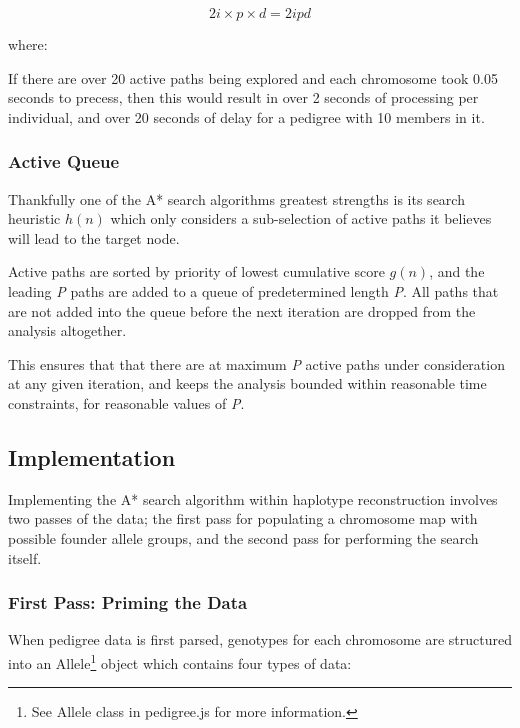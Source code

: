 \begin{equation}\label{eqn:time2proc}
2i \times p \times d = 2ipd
\end{equation}

where:
\begin{description}
\end{description}

If there are over 20 active paths being explored and each chromosome took 0.05 seconds to precess, then this would result in over 2 seconds of processing per individual, and over 20 seconds of delay for a pedigree with 10 members in it.

\subsubsection{Active Queue}

Thankfully one of the A* search algorithms greatest strengths is its search heuristic $h(n)$ which only considers a sub-selection of active paths it believes will lead to the target node. 

Active paths are sorted by priority of lowest cumulative score $g(n)$, and the leading \textit{P} paths are added to a queue of predetermined length \textit{P}. All paths that are not added into the queue before the next iteration are dropped from the analysis altogether. 

This ensures that that there are at maximum \textit{P} active paths under consideration at any given iteration, and keeps the analysis bounded within reasonable time constraints, for reasonable values of \textit{P}.


\subsection{Implementation}

Implementing the A* search algorithm within haplotype reconstruction involves two passes of the data; the first pass for populating a chromosome map with possible founder allele groups, and the second pass for performing the search itself.

\subsubsection{First Pass: Priming the Data}

When pedigree data is first parsed, genotypes for each chromosome are structured into an Allele\footnote{See Allele class in pedigree.js for more information.} object which contains four types of data:

